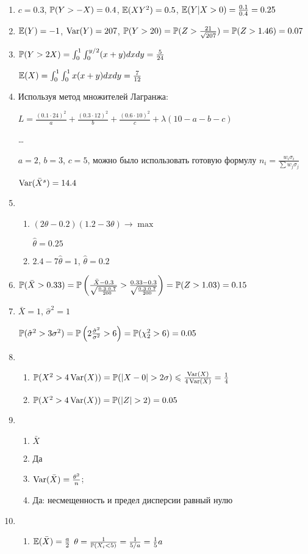 \begin{enumerate}
\item $c=0.3$, $\P(Y>-X)=0.4$, $\E(XY^{2})=0.5$, $\E(Y|X>0)=\frac{0.1}{0.4}=0.25$
\item $\E(Y)=-1$, $\Var(Y)=207$, $\P(Y>20)=\P(Z>\frac{21}{\sqrt{207}})=\P(Z>1.46)=0.07$
\item $\P(Y>2X)=\int_{0}^{1}\int_{0}^{y/2}(x+y)dxdy=\frac{5}{24}$

$\E(X)=\int_{0}^{1}\int_{0}^{1}x(x+y)dxdy=\frac{7}{12}$
\item Используя метод множителей Лагранжа:

$L=\frac{(0.1\cdot 24)^{2}}{a}+\frac{(0.3\cdot 12)^{2}}{b}+\frac{(0.6\cdot 10)^{2}}{c}+\lambda(10-a-b-c)$

\ldots

$a=2$, $b=3$, $c=5$, можно было использовать готовую формулу
$n_{i}=\frac{w_{i}\sigma_{i}}{\sum w_{j}\sigma_{j}}$

$\Var(\bar X^{s})=14.4$
\item
\begin{enumerate}
\item $(2\theta-0.2)(1.2-3\theta)\rightarrow\max$

$\hat{\theta}=0.25$
\item $2.4-7\hat{\theta}=1$, $\hat{\theta}=0.2$
\end{enumerate}
\item $\P(\bar X>0.33)=\P\left(\frac{\bar{X}-0.3}{\sqrt{\frac{0.3\cdot
0.7}{200}}}>\frac{0.33-0.3}{\sqrt{\frac{0.3\cdot
0.7}{200}}}\right)=\P(Z>1.03)=0.15$
\item $\bar{X}=1$, $\hat{\sigma}^{2}=1$

$\P(\hat{\sigma}^{2}>3\sigma^{2})=\P\left(2\frac{\hat{\sigma}^{2}}{\sigma^{2}}>6\right)=\P(\chi_{2}^{2}>6)=0.05$
\item
\begin{enumerate}
\item $\P(X^{2}>4\Var(X))=\P(|X-0|>2\sigma)\le
\frac{\Var(X)}{4\Var(X)}=\frac{1}{4}$
\item $\P(X^{2}>4\Var(X))=\P(|Z|>2)=0.05$
\end{enumerate}
\item
\begin{enumerate}
\item $\bar X$
\item Да
\item $\Var(\bar X)=\frac{\theta^{2}}{n}$;
\item Да: несмещенность и предел дисперсии равный нулю
\end{enumerate}
\item
\begin{enumerate}
\item $\E(\bar X)=\frac{a}{2}$
$\theta=\frac{1}{\P(X_{i}<5)}=\frac{1}{5/a}=\frac{1}{5}a$


\end{enumerate}
\end{enumerate}

